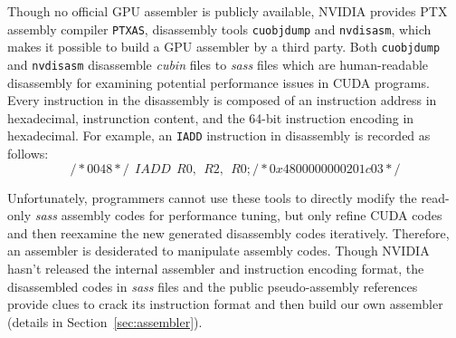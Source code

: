 Though no official GPU assembler is publicly available, 
NVIDIA provides PTX assembly compiler {\tt PTXAS}, disassembly tools {\tt cuobjdump} and {\tt nvdisasm}, which makes it possible to build a GPU assembler by a third party.
Both {\tt cuobjdump} and {\tt nvdisasm} disassemble {\em cubin} files to {\em sass} files which are human-readable disassembly for examining potential performance issues in CUDA programs. 
Every instruction in the disassembly is composed of an instruction address
in hexadecimal, instrunction content, and the 64-bit instruction encoding in hexadecimal. 
For example, an {\tt IADD} instruction in disassembly is recorded as follows:
{\footnotesize
\begin{equation}
\label{eq:iadd}
    /*0048*/~~IADD~~R0,~~R2,~~R0;/*0x4800000000201c03*/
\end{equation}
}

Unfortunately, programmers cannot use these tools to directly modify the read-only {\em sass} assembly codes for performance tuning, but only refine CUDA codes and then reexamine the new generated disassembly codes iteratively.
Therefore, an assembler is desiderated to manipulate assembly codes. 
Though NVIDIA hasn't released the internal assembler and instruction encoding format, the disassembled codes in {\em sass} files and the public pseudo-assembly references~\cite{ptx2015isa} provide clues to crack its instruction format and then build our own assembler (details in Section~\ref{sec:assembler}).


